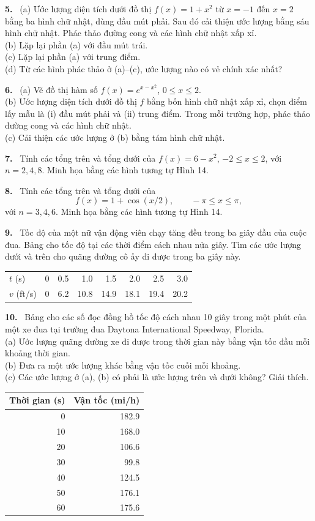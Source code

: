 \documentclass[12pt,a4paper]{article}
\newcommand{\bt}[1]{\par\smallskip\Needspace{5\baselineskip}\noindent\textbf{#1.}\ }
\begin{document}
\bt{5} (a) Ước lượng diện tích dưới đồ thị $f(x)=1+x^2$ từ $x=-1$ đến $x=2$ bằng ba hình chữ nhật, dùng đầu mút phải. Sau đó cải thiện ước lượng bằng sáu hình chữ nhật. Phác thảo đường cong và các hình chữ nhật xấp xỉ.\\(b) Lặp lại phần (a) với đầu mút trái.\\(c) Lặp lại phần (a) với trung điểm.\\(d) Từ các hình phác thảo ở (a)–(c), ước lượng nào có vẻ chính xác nhất?
\bt{6} (a) Vẽ đồ thị hàm số $f(x)=e^{x-x^2}$, $0\le x\le2$.\\(b) Ước lượng diện tích dưới đồ thị $f$ bằng bốn hình chữ nhật xấp xỉ, chọn điểm lấy mẫu là (i) đầu mút phải và (ii) trung điểm. Trong mỗi trường hợp, phác thảo đường cong và các hình chữ nhật.\\(c) Cải thiện các ước lượng ở (b) bằng tám hình chữ nhật.
\bt{7} Tính các tổng trên và tổng dưới của $f(x)=6-x^2$, $-2\le x\le2$, với $n=2,4,8$. Minh họa bằng các hình tương tự Hình 14.
\bt{8} Tính các tổng trên và tổng dưới của
\[f(x)=1+\cos(x/2),\qquad-\pi\le x\le\pi,\]
với $n=3,4,6$. Minh họa bằng các hình tương tự Hình 14.
\bt{9} Tốc độ của một nữ vận động viên chạy tăng đều trong ba giây đầu của cuộc đua. Bảng cho tốc độ tại các thời điểm cách nhau nửa giây. Tìm các ước lượng dưới và trên cho quãng đường cô ấy đi được trong ba giây này.
\begin{center}\begin{tabular}{lrrrrrrr}\toprule
$t$ (s)&0&0.5&1.0&1.5&2.0&2.5&3.0\\$v$ (ft/s)&0&6.2&10.8&14.9&18.1&19.4&20.2\\\bottomrule\end{tabular}\end{center}
\bt{10} Bảng cho các số đọc đồng hồ tốc độ cách nhau 10 giây trong một phút của một xe đua tại trường đua Daytona International Speedway, Florida.\\(a) Ước lượng quãng đường xe đi được trong thời gian này bằng vận tốc đầu mỗi khoảng thời gian.\\(b) Đưa ra một ước lượng khác bằng vận tốc cuối mỗi khoảng.\\(c) Các ước lượng ở (a), (b) có phải là ước lượng trên và dưới không? Giải thích.
\begin{center}\begin{tabular}{rr}\toprule Thời gian (s)&Vận tốc (mi/h)\\\midrule
0&182.9\\10&168.0\\20&106.6\\30&99.8\\40&124.5\\50&176.1\\60&175.6\\\bottomrule\end{tabular}\end{center}
\end{document}
